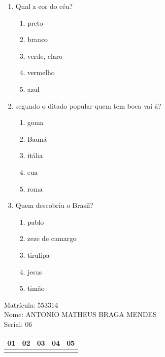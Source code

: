 \documentclass[10pt,a4paper,twocolumn]{report}
\begin{document}
 \begin{enumerate} 
    \item  Qual a cor do céu?





    \begin{enumerate}
    \item  preto

\item  branco

\item  verde, claro

\item  vermelho

\item  azul


    \end{enumerate} 
    \item  segundo o ditado popular quem tem boca vai à?





    \begin{enumerate}
    \item  goma

\item  Bauná

\item  itália

\item  eua

\item  roma


    \end{enumerate} 
    \item  Quem descobriu o Brasil?





    \begin{enumerate}
    \item  pablo

\item  zeze de camargo

\item  tirulipa

\item  jesus

\item  timão


    \end{enumerate}\end{enumerate} 
Matrícula: 553314\\ Nome: ANTONIO MATHEUS BRAGA MENDES \\ Serial: 06\\
\begin{tabular}{|l|l|l|l|l|}\hline
01  &02  &03  &04  &05 \\ \hline 
 & & & & \\ \hline 
\end{tabular}
 \cleardoublepage 
\end{document}
